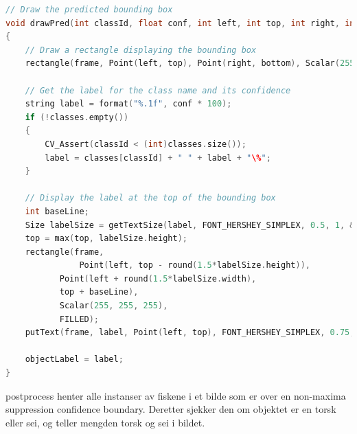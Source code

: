 \begin{lstlisting}[language=C++, caption=main.cpp]
// Draw the predicted bounding box
void drawPred(int classId, float conf, int left, int top, int right, int bottom, Mat& frame)
{
    // Draw a rectangle displaying the bounding box
    rectangle(frame, Point(left, top), Point(right, bottom), Scalar(255, 178, 50), 3);

    // Get the label for the class name and its confidence
    string label = format("%.1f", conf * 100);
    if (!classes.empty())
    {
        CV_Assert(classId < (int)classes.size());
        label = classes[classId] + " " + label + "\%";
    }

    // Display the label at the top of the bounding box
    int baseLine;
    Size labelSize = getTextSize(label, FONT_HERSHEY_SIMPLEX, 0.5, 1, &baseLine);
    top = max(top, labelSize.height);
    rectangle(frame,
    		   Point(left, top - round(1.5*labelSize.height)),
		   Point(left + round(1.5*labelSize.width),
		   top + baseLine),
		   Scalar(255, 255, 255),
		   FILLED);
    putText(frame, label, Point(left, top), FONT_HERSHEY_SIMPLEX, 0.75, Scalar(0,0,0),1);

    objectLabel = label;
}
\end{lstlisting}

postprocess henter alle instanser av fiskene i et bilde som er over en non-maxima suppression confidence boundary. Deretter sjekker den om objektet er en torsk eller sei, og teller mengden torsk og sei i bildet.

